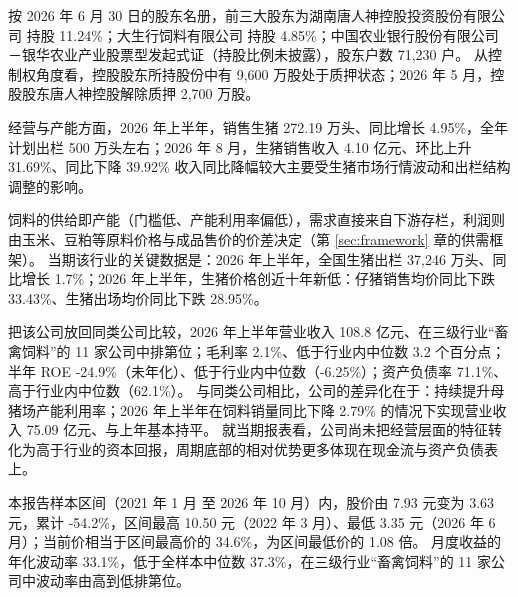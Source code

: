  按 2026 年 6 月 30 日的股东名册，前三大股东为湖南唐人神控股投资股份有限公司 持股 11.24\%；大生行饲料有限公司 持股 4.85\%；中国农业银行股份有限公司－银华农业产业股票型发起式证（持股比例未披露），股东户数 71,230 户。 从控制权角度看，控股股东所持股份中有 9,600 万股处于质押状态；2026 年 5 月，控股股东唐人神控股解除质押 2,700 万股。

 经营与产能方面，2026 年上半年，销售生猪 272.19 万头、同比增长 4.95\%，全年计划出栏 500 万头左右；2026 年 8 月，生猪销售收入 4.10 亿元、环比上升 31.69\%、同比下降 39.92\% 收入同比降幅较大主要受生猪市场行情波动和出栏结构调整的影响。

 饲料的供给即产能（门槛低、产能利用率偏低），需求直接来自下游存栏，利润则由玉米、豆粕等原料价格与成品售价的价差决定（第 \ref{sec:framework} 章的供需框架）。 当期该行业的关键数据是：2026 年上半年，全国生猪出栏 37,246 万头、同比增长 1.7\%；2026 年上半年，生猪价格创近十年新低：仔猪销售均价同比下跌 33.43\%、生猪出场均价同比下跌 28.95\%。

 把该公司放回同类公司比较，2026 年上半年营业收入 108.8 亿元、在三级行业“畜禽饲料”的 11 家公司中排第位；毛利率 2.1\%、低于行业内中位数 3.2 个百分点；半年 ROE -24.9\%（未年化）、低于行业内中位数（-6.25\%）；资产负债率 71.1\%、高于行业内中位数（62.1\%）。 与同类公司相比，公司的差异化在于：持续提升母猪场产能利用率；2026 年上半年在饲料销量同比下降 2.79\% 的情况下实现营业收入 75.09 亿元、与上年基本持平。 就当期报表看，公司尚未把经营层面的特征转化为高于行业的资本回报，周期底部的相对优势更多体现在现金流与资产负债表上。

 本报告样本区间（2021 年 1 月 至 2026 年 10 月）内，股价由 7.93 元变为 3.63 元，累计 -54.2\%，区间最高 10.50 元（2022 年 3 月）、最低 3.35 元（2026 年 6 月）；当前价相当于区间最高价的 34.6\%，为区间最低价的 1.08 倍。 月度收益的年化波动率 33.1\%，低于全样本中位数 37.3\%，在三级行业“畜禽饲料”的 11 家公司中波动率由高到低排第位。

